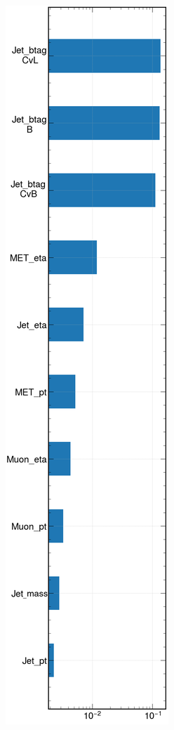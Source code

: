 \label{sec:signal}
\vspace{-1cm}
\minitoc

\begin{minipage}[H]{\linewidth}
\begin{minipage}{0.35\linewidth}
        \centering
        \includegraphics[height=0.92\textheight]{fig//chap08-kin_reco/ranking1D.png}

\end{minipage}
\end{minipage}
